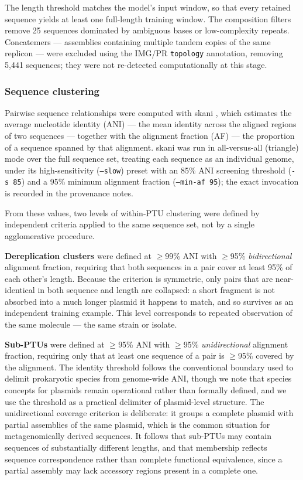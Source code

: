 The length threshold matches the model's input window, so that every retained
sequence yields at least one full-length training window. The composition
filters remove 25 sequences dominated by ambiguous bases or low-complexity
repeats. Concatemers --- assemblies containing multiple tandem copies of the
same replicon --- were excluded using the IMG/PR \texttt{topology} annotation,
removing 5,441 sequences; they were not re-detected computationally at this
stage.

\subsubsection*{Sequence clustering}

Pairwise sequence relationships were computed with skani
\cite{shaw2023fast}, which estimates the average nucleotide identity (ANI) ---
the mean identity across the aligned regions of two sequences --- together
with the alignment fraction (AF) --- the proportion of a sequence spanned by
that alignment. skani was run in all-versus-all (triangle) mode over the full
sequence set, treating each sequence as an individual genome, under its
high-sensitivity (\texttt{--slow}) preset with an 85\% ANI screening
threshold (\texttt{-s 85}) and a 95\% minimum alignment fraction
(\texttt{--min-af 95}); the exact invocation is recorded in the provenance
notes.

From these values, two levels of within-PTU clustering were defined by
independent criteria applied to the same sequence set, not by a single
agglomerative procedure.

\textbf{Dereplication clusters} were defined at $\geq$99\% ANI with $\geq$95\%
\emph{bidirectional} alignment fraction, requiring that both sequences in a
pair cover at least 95\% of each other's length. Because the criterion is
symmetric, only pairs that are near-identical in both sequence and length are
collapsed: a short fragment is not absorbed into a much longer plasmid it
happens to match, and so survives as an independent training example. This
level corresponds to repeated observation of the same molecule --- the same
strain or isolate.

\textbf{Sub-PTUs} were defined at $\geq$95\% ANI with $\geq$95\%
\emph{unidirectional} alignment fraction, requiring only that at least one
sequence of a pair is $\geq$95\% covered by the alignment. The identity
threshold follows the conventional boundary used to delimit prokaryotic
species from genome-wide ANI, \cite{jain2018high} though we note that species
concepts for plasmids remain operational rather than formally defined, and we
use the threshold as a practical delimiter of plasmid-level structure. The
unidirectional coverage criterion is deliberate: it groups a complete plasmid
with partial assemblies of the same plasmid, which is the common situation
for metagenomically derived sequences. It follows that sub-PTUs may contain
sequences of substantially different lengths, and that membership reflects
sequence correspondence rather than complete functional equivalence, since a
partial assembly may lack accessory regions present in a complete one.

